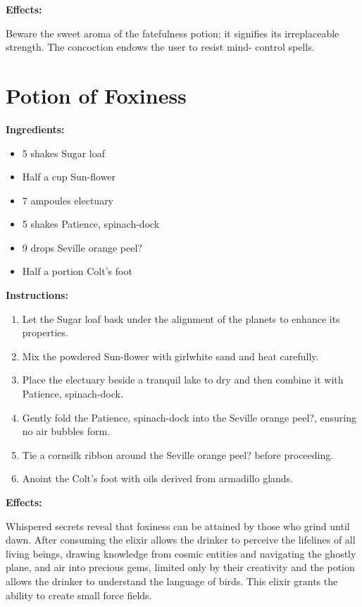 \documentclass{article}
\begin{document}
\textbf{Effects:}

Beware the sweet aroma of the fatefulness potion; it signifies its irreplaceable strength. The concoction endows the user to resist mind- control spells.

\newpage
\section*{Potion of Foxiness}

\textbf{Ingredients:}

\begin{itemize}
  \item 5 shakes Sugar loaf
  \item Half a cup Sun-flower
  \item 7 ampoules electuary
  \item 5 shakes Patience, spinach-dock
  \item 9 drops Seville orange peel?
  \item Half a portion Colt's foot
\end{itemize}

\textbf{Instructions:}

\begin{enumerate}
  \item Let the Sugar loaf bask under the alignment of the planets to enhance its properties.
  \item Mix the powdered Sun-flower with girlwhite sand and heat carefully.
  \item Place the electuary beside a tranquil lake to dry and then combine it with Patience, spinach-dock.
  \item Gently fold the Patience, spinach-dock into the Seville orange peel?, ensuring no air bubbles form.
  \item Tie a cornsilk ribbon around the Seville orange peel? before proceeding.
  \item Anoint the Colt's foot with oils derived from armadillo glands.
\end{enumerate}

\textbf{Effects:}

Whispered secrets reveal that foxiness can be attained by those who grind until dawn. After consuming the elixir allows the drinker to perceive the lifelines of all living beings, drawing knowledge from cosmic entities and navigating the ghostly plane, and air into precious gems, limited only by their creativity and the potion allows the drinker to understand the language of birds. This elixir grants the ability to create small force fields.
\end{document}
